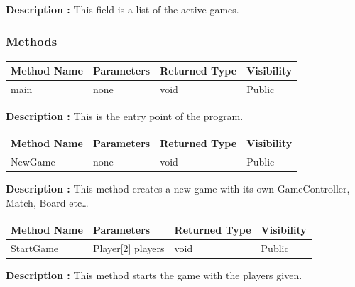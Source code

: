 \documentclass[12pt]{article}
\begin{document}
\textbf{Description :} This field is a list of the active games.

\subsubsection{Methods}

\begin{table}[H]
    \begin{tabular}{|l|l|l|l|}
    \hline
    \rowcolor[HTML]{EFEFEF} 
    \cellcolor[HTML]{EFEFEF}\textbf{Method Name} & \textbf{Parameters}    & \textbf{Returned Type} & \textbf{Visibility} \\ \hline
    main                                         & none                   & void                   & Public              \\ \hline
    \end{tabular}
\end{table}

\textbf{Description :} This is the entry point of the program.

\begin{table}[H]
    \begin{tabular}{|l|l|l|l|}
    \hline
    \rowcolor[HTML]{EFEFEF} 
    \cellcolor[HTML]{EFEFEF}\textbf{Method Name} & \textbf{Parameters}    & \textbf{Returned Type} & \textbf{Visibility} \\ \hline
    NewGame                                      & none                   & void                   & Public              \\ \hline
    \end{tabular}
\end{table}

\textbf{Description :} This method creates a new game with its own GameController, Match, Board etc\dots

\begin{table}[H]
    \begin{tabular}{|l|l|l|l|}
    \hline
    \rowcolor[HTML]{EFEFEF} 
    \cellcolor[HTML]{EFEFEF}\textbf{Method Name} & \textbf{Parameters}    & \textbf{Returned Type} & \textbf{Visibility} \\ \hline
    StartGame                                    & Player[2] players      & void                   & Public              \\ \hline
    \end{tabular}
\end{table}

\textbf{Description :} This method starts the game with the players given.
\end{document}
